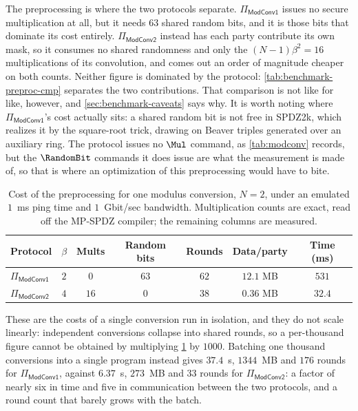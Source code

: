 The preprocessing is where the two protocols separate.
$\Pi_\mathsf{ModConv1}$ issues no secure multiplication at all, but it needs $63$ shared random bits, and it is those bits that dominate its cost entirely.
$\Pi_\mathsf{ModConv2}$ instead has each party contribute its own mask, so it consumes no shared randomness and only the $(N-1)\beta^2 = 16$ multiplications of its convolution, and comes out an order of magnitude cheaper on both counts.
Neither figure is dominated by the protocol: \cref{tab:benchmark-preproc-cmp} separates the two contributions.
That comparison is not like for like, however, and \cref{sec:benchmark-caveats} says why.
It is worth noting where $\Pi_\mathsf{ModConv1}$'s cost actually sits: a shared random bit is not free in SPDZ2k, which realizes it by the square-root trick, drawing on Beaver triples generated over an auxiliary ring.
The protocol issues no $\Mul$ command, as \cref{tab:modconv} records, but the $\RandomBit$ commands it does issue are what the measurement is made of, so that is where an optimization of this preprocessing would have to bite.

\begin{table}[tbp]
    \caption{%
        Cost of the preprocessing for one modulus conversion, $N = 2$, under an emulated $1$~ms ping time and $1$~Gbit/sec bandwidth.
        Multiplication counts are exact, read off the MP-SPDZ compiler; the remaining columns are measured.%
    }
    \label{tab:benchmark-preproc}
    \centering
    \small
    \begin{tabular}{@{}lcccccc@{}}
        \toprule
        Protocol & $\beta$ & Mults & Random bits & Rounds & Data/party & Time (ms) \\
        \midrule
        $\Pi_\mathsf{ModConv1}$ & $2$ & $0$  & $63$ & $62$ & $12.1$ MB & $531$ \\
        $\Pi_\mathsf{ModConv2}$ & $4$ & $16$ & $0$  & $38$ & $0.36$ MB & $32.4$ \\
        \bottomrule
    \end{tabular}
\end{table}

These are the costs of a single conversion run in isolation, and they do not scale linearly: independent conversions collapse into shared rounds, so a per-thousand figure cannot be obtained by multiplying \cref{tab:benchmark-preproc} by $1000$.
Batching one thousand conversions into a single program instead gives $37.4$~s, $1344$~MB and $176$ rounds for $\Pi_\mathsf{ModConv1}$, against $6.37$~s, $273$~MB and $33$ rounds for $\Pi_\mathsf{ModConv2}$: a factor of nearly six in time and five in communication between the two protocols, and a round count that barely grows with the batch.

